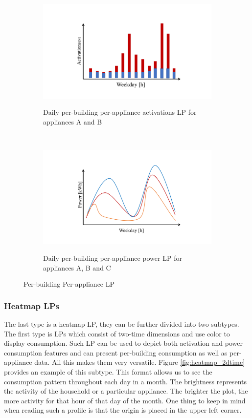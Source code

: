 \begin{figure}[H]
	\begin{subfigure}{.5\textwidth}
		\caption{Daily per-building per-appliance activations LP for appliances A and B}
		\includegraphics[width=1.2\textwidth]{Figures/profile_sketches/slide8.pdf}
		\label{fig:daily_act_m_profile}
	\end{subfigure}%
	~ 
	\begin{subfigure}{.5\textwidth}
		\caption{Daily per-building per-appliance power LP for appliances A, B and C}
		\includegraphics[width=1.2\textwidth]{Figures/profile_sketches/slide2.pdf}
		\label{fig:daily_power_m_profile}
	\end{subfigure}%
	\label{fig:daily_m_profile}
	\caption{Per-building Per-appliance LP}
\end{figure}

\subsubsection{Heatmap LPs}

The last type is a heatmap LP, they can be further divided into two subtypes.
The first type is LPs which consist of two-time dimensions and use color to display consumption.
Such LP can be used to depict both activation and power consumption features and can present per-building consumption as well as per-appliance data.
All this makes them very versatile.
Figure \ref{fig:heatmap_2dtime} provides an example of this subtype.
This format allows us to see the consumption pattern throughout each day in a month.
The brightness represents the activity of the household or a particular appliance.
The brighter the plot, the more activity for that hour of that day of the month.
One thing to keep in mind when reading such a profile is that the origin is placed in the upper left corner.

